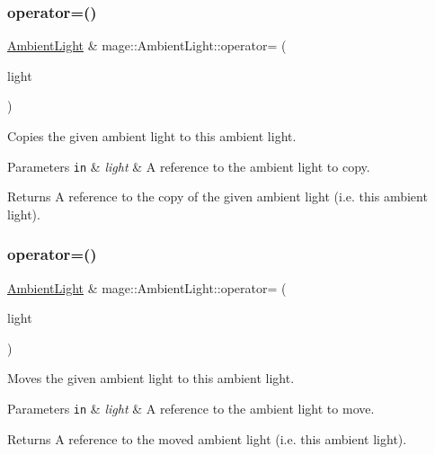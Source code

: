 \subsubsection{\texorpdfstring{operator=()}{operator=()}\hspace{0.1cm}{\footnotesize\ttfamily [1/2]}}
{\footnotesize\ttfamily \hyperlink{classmage_1_1_ambient_light}{Ambient\+Light} \& mage\+::\+Ambient\+Light\+::operator= (\begin{DoxyParamCaption}\item[{const \hyperlink{classmage_1_1_ambient_light}{Ambient\+Light} \&}]{light }\end{DoxyParamCaption})\hspace{0.3cm}{\ttfamily [default]}}

Copies the given ambient light to this ambient light.


\begin{DoxyParams}[1]{Parameters}
\mbox{\tt in}  & {\em light} & A reference to the ambient light to copy. \\
\hline
\end{DoxyParams}
\begin{DoxyReturn}{Returns}
A reference to the copy of the given ambient light (i.\+e. this ambient light). 
\end{DoxyReturn}
\hypertarget{classmage_1_1_ambient_light_ae54bf8695957fb438e162a913725922a}{}\label{classmage_1_1_ambient_light_ae54bf8695957fb438e162a913725922a} 
\subsubsection{\texorpdfstring{operator=()}{operator=()}\hspace{0.1cm}{\footnotesize\ttfamily [2/2]}}
{\footnotesize\ttfamily \hyperlink{classmage_1_1_ambient_light}{Ambient\+Light} \& mage\+::\+Ambient\+Light\+::operator= (\begin{DoxyParamCaption}\item[{\hyperlink{classmage_1_1_ambient_light}{Ambient\+Light} \&\&}]{light }\end{DoxyParamCaption})\hspace{0.3cm}{\ttfamily [default]}}

Moves the given ambient light to this ambient light.


\begin{DoxyParams}[1]{Parameters}
\mbox{\tt in}  & {\em light} & A reference to the ambient light to move. \\
\hline
\end{DoxyParams}
\begin{DoxyReturn}{Returns}
A reference to the moved ambient light (i.\+e. this ambient light). 
\end{DoxyReturn}
\hypertarget{classmage_1_1_ambient_light_aac9a833f2261eaa1bf5eaab7608fc878}{}\label{classmage_1_1_ambient_light_aac9a833f2261eaa1bf5eaab7608fc878} 
